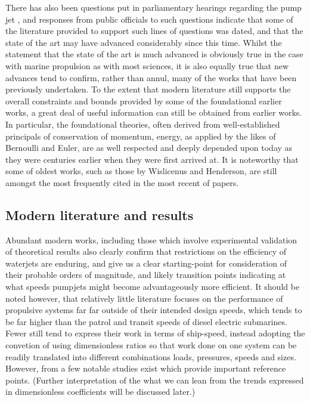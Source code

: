 \documentclass{article}\usepackage[]{graphicx}\usepackage[]{color}
\begin{document}
There has also been questions put in parliamentary hearings regarding the pump jet \parencite{patrick2017}, and responses from public officials to such questions indicate that some of the literature provided to support such lines of questions was dated, and that the state of the art may have advanced considerably since this time.  Whilst the statement that the state of the art is much advanced is obviously true in the case with marine propulsion as with most sciences, it is also equally true that new advances tend to confirm, rather than annul, many of the works that have been previously undertaken.  To the extent that modern literature still supports the overall constraints and bounds provided by some of the foundational earlier works, a great deal of useful information can still be obtained from earlier works.  In particular, the foundational theories, often derived from well-established principals of conservation of momentum, energy, as applied by the likes of Bernoulli and Euler, are as well respected and deeply depended upon today as they were centuries earlier when they were first arrived at.  It is noteworthy that some of oldest works, such as those by Wislicenus and Henderson, are still amongst the most frequently cited in the most recent of papers.

\subsection{Modern literature and results}
Abundant modern works, including those which involve experimental validation of theoretical results also clearly confirm that restrictions on the efficiency of waterjets are enduring, and give us a clear starting-point for consideration of their probable orders of magnitude, and likely transition points indicating at what speeds pumpjets might become advantageously more efficient.  It should be noted however, that relatively little literature focuses on the performance of propulsive systems far far outside of their intended design speeds, which tends to be far higher than the patrol and transit speeds of diesel electric submarines.  Fewer still tend to express their work in terms of ship-speed, instead adopting the convetion of using dimensionless ratios so that work done on one system can be readily translated into different combinations loads, pressures, speeds and sizes.  However, from a few notable studies exist which provide important reference points. (Further interpretation of the what we can lean from the trends expressed in dimensionless coefficients will be discussed later.)
\end{document}
